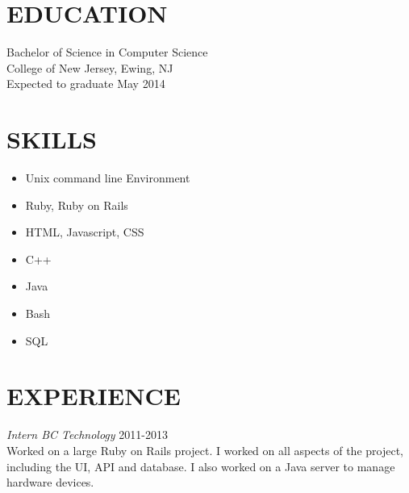 \documentclass[line, margin]{res}
\begin{document}
  \address{63 Villa Ave. \\ Pitman, NJ 08071 \\ (609)-670-5137}

  \begin{resume}
    \section{EDUCATION}
    Bachelor of Science in Computer Science \\
    College of New Jersey, Ewing, NJ \\
    Expected to graduate May 2014
    \section{SKILLS}
    \begin{itemize}
        \item Unix command line Environment
        \item Ruby, Ruby on Rails
        \item HTML, Javascript, CSS
        \item C++
        \item Java
        \item Bash
        \item SQL
    \end{itemize}
    \section{EXPERIENCE}
    \textit{Intern BC Technology} \hfill 2011-2013 \\
    Worked on a large Ruby on Rails project. I worked 
    on all aspects of the project, including the UI, API
    and database. I also worked on a Java server to manage
    hardware devices.
  \end{resume}
\end{document}
